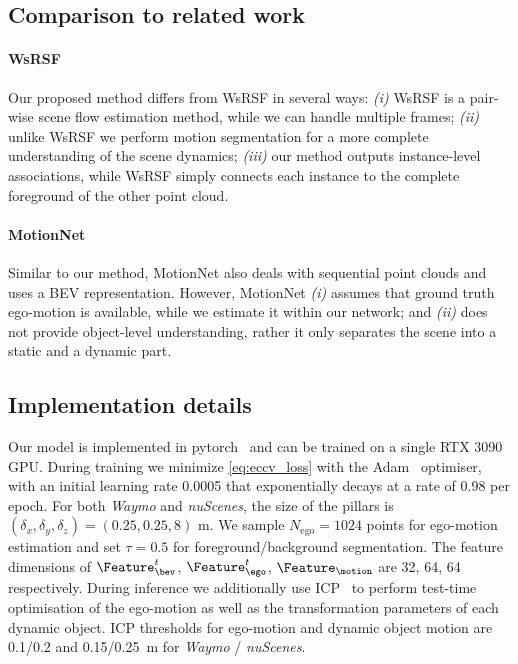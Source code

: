 \subsection{Comparison to related work}
\paragraph{WsRSF~\cite{gojcic2021weakly}} Our proposed method differs from WsRSF in several ways: \textit{(i)} WsRSF is a pair-wise scene flow estimation method, while we can handle multiple frames; \textit{(ii)} unlike WsRSF we perform motion segmentation for a more complete understanding of the scene dynamics; \textit{(iii)} our method outputs instance-level associations, while WsRSF simply connects each instance to the complete foreground of the other point cloud.

\paragraph{MotionNet~\cite{wu2020motionnet}} Similar to our method, MotionNet also deals with sequential point clouds and uses a BEV representation. However, MotionNet \textit{(i)} assumes that ground truth ego-motion is available, while we estimate it within our network; and \textit{(ii)} does not provide object-level understanding, rather it only separates the scene into a static and a dynamic part. 

\subsection{Implementation details}
Our model is implemented in pytorch~\cite{NEURIPS2019_9015} and can be trained on a single RTX 3090 GPU. During training we minimize \cref{eq:eccv_loss} with the Adam~\cite{kingma2014adam} optimiser, with an initial learning rate 0.0005 that exponentially decays at a rate of 0.98 per epoch. For both \emph{Waymo} and \emph{nuScenes}, the size of the pillars is $(\delta_x, \delta_y, \delta_z) = (0.25, 0.25, 8)$ m. We sample $N_{\text{ego}} = 1024$ points for ego-motion estimation and set $\tau =0.5$ for foreground/background segmentation. The feature dimensions of $\Feature_\bev^t$, $\Feature_\ego^t$, $\Feature_\motion$ are 32, 64, 64 respectively. During inference we additionally use ICP~\cite{besl1992method} to perform test-time optimisation of the ego-motion as well as the transformation parameters of each dynamic object. ICP thresholds for ego-motion and dynamic object motion are 0.1/0.2 and 0.15/0.25 $\,$m for \emph{Waymo} / \emph{nuScenes}. 




